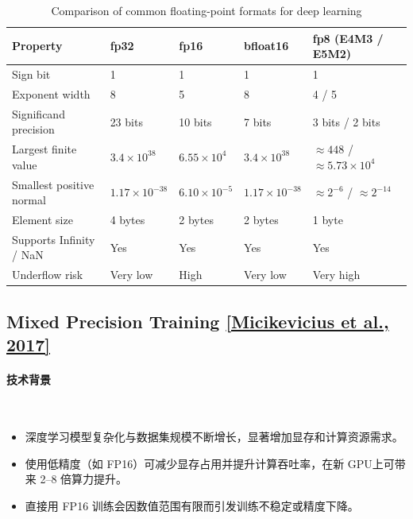 
\begin{table}[h]
\centering
\renewcommand{\arraystretch}{1.3}
\begin{tabular}{l l l l l}
\hline
\textbf{Property} & \textbf{fp32} & \textbf{fp16} & \textbf{bfloat16} & \textbf{fp8 (E4M3 / E5M2)} \\
\hline
Sign bit & 1 & 1 & 1 & 1 \\
Exponent width & 8 & 5 & 8 & 4 / 5 \\
Significand precision & 23 bits & 10 bits & 7 bits & 3 bits / 2 bits \\
Largest finite value & $3.4\times 10^{38}$ & $6.55\times 10^{4}$ & $3.4\times 10^{38}$ & $\approx 448$ / $\approx 5.73\times 10^{4}$ \\
Smallest positive normal & $1.17\times 10^{-38}$ & $6.10\times 10^{-5}$ & $1.17\times 10^{-38}$ & $\approx 2^{-6}$ / $\approx 2^{-14}$ \\
Element size & 4 bytes & 2 bytes & 2 bytes & 1 byte \\
Supports Infinity / NaN & Yes & Yes & Yes & Yes \\
Underflow risk & Very low & High & Very low & Very high \\
\hline
\end{tabular}
\caption{Comparison of common floating-point formats for deep learning}
\label{tab:fp_all_compare}
\end{table}

\clearpage
\subsection{Mixed Precision Training \href{https://arxiv.org/pdf/1710.03740.pdf}{[Micikevicius et al., 2017]}}

\paragraph{技术背景}~{}
\begin{itemize}
    \item 深度学习模型复杂化与数据集规模不断增长，显著增加显存和计算资源需求。
    \item 使用低精度（如 FP16）可减少显存占用并提升计算吞吐率，在新 GPU上可带来 2--8 倍算力提升。
    \item 直接用 FP16 训练会因数值范围有限而引发训练不稳定或精度下降。
\end{itemize}


